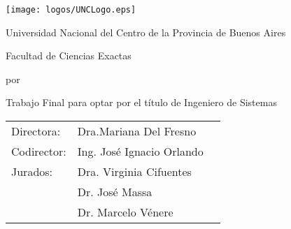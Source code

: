 \begin{titlepage}

\begin{center}
	
\texttt{[image: logos/UNCLogo.eps]}
\bigskip
\vspace*{2\bigskipamount}

Universidad Nacional del Centro de la Provincia de Buenos Aires
\bigskip


Facultad de Ciencias Exactas
\bigskip
\vspace*{2\bigskipamount}



{\makeatletter
\titlestyle\color{tudelft-dark-blue}\LARGE\@title
\makeatother}

\vspace*{2\bigskipamount}

\bigskip
\bigskip

por

\bigskip
\bigskip

{\makeatletter
	\titlefont\Large\bfseries\@author
	\makeatother}
\vfill
\bigskip

\vfill
\bigskip
\bigskip



Trabajo Final para optar por el título de Ingeniero de Sistemas

\bigskip
\bigskip

\begin{tabular}{lll}
	Directora: & Dra.Mariana Del Fresno \\
	Codirector: & Ing. José Ignacio Orlando \\
	Jurados:
	& Dra. Virginia Cifuentes\\
	& Dr. José Massa \\
	& Dr. Marcelo Vénere        
\end{tabular}


{\makeatletter
\ifx\@subtitle\undefined\else
    \bigskip
    \titlefont\titleshape\LARGE\@subtitle
\fi
\makeatother}






\bigskip
\bigskip
\bigskip
\bigskip




\bigskip
\bigskip

\bigskip
\bigskip

\end{center}

\end{titlepage}

